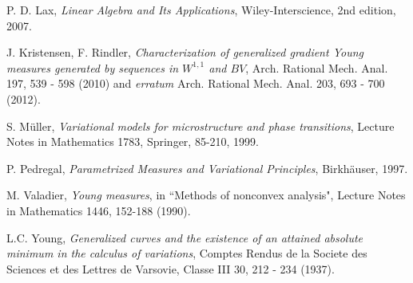 \documentclass{amsart}
\theoremstyle{definition}
\numberwithin{equation}{section}
\begin{document}
\begin{thebibliography}{30}
 P. D. Lax, \emph{Linear Algebra and Its Applications}, Wiley-Interscience, 2nd edition, 2007.

 J. Kristensen, F. Rindler, \emph{Characterization of generalized gradient Young measures generated by sequences in $W^{1,1}$ and $BV$}, Arch. Rational Mech. Anal. 197, 539 - 598 (2010) and \emph{erratum} Arch. Rational Mech. Anal. 203, 693 - 700 (2012).

 S. M\"uller, \emph{Variational models for microstructure and phase transitions}, Lecture Notes in Mathematics 1783, Springer, 85-210, 1999.

 P. Pedregal, \emph{Parametrized Measures and Variational Principles}, Birkh\"auser, 1997.

 M. Valadier, \emph{Young measures}, in ``Methods of nonconvex analysis", Lecture Notes in Mathematics 1446, 152-188 (1990).

 L.C. Young, \emph{Generalized curves and the existence of an attained absolute minimum in the calculus of variations}, Comptes Rendus de la Societe des Sciences et des Lettres de Varsovie, Classe III 30, 212 - 234 (1937).

\end{thebibliography}
\end{document}
